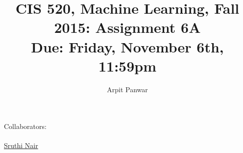 \documentclass[english]{article}
\title{CIS 520, Machine Learning, Fall 2015: Assignment 6A \\
Due: Friday, November 6th, 11:59pm \\
\points{54} }
\author{Arpit Panwar}
\date{}
\begin{document}
\maketitle
{\normalsize Collaborators: \\ 
\\ \underline{Sruthi Nair   }}


\end{document}
